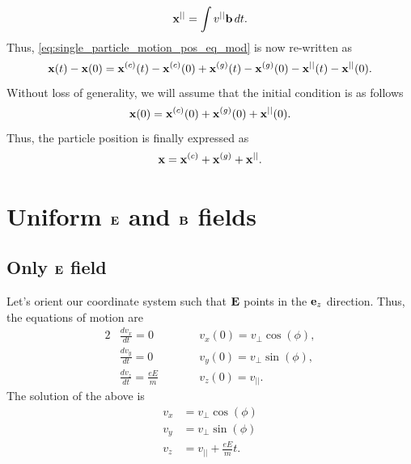 \documentclass[oneside,a4paper,11pt]{report}
\begin{document}
\begin{equation}
    \mathbf{x}^{||} = \int v^{||} \mathbf{b} \, dt.
\end{equation}
Thus, \cref{eq:single_particle_motion_pos_eq_mod} is now re-written as
\begin{equation}
    \mathbf{x}(t) - \mathbf{x}(0) = \mathbf{x}^{(c)}(t) - \mathbf{x}^{(c)}(0) + \mathbf{x}^{(g)}(t) - \mathbf{x}^{(g)}(0) - \mathbf{x}^{||}(t) - \mathbf{x}^{||}(0).
\end{equation}
Without loss of generality, we will assume that the initial condition is as follows
\begin{equation}
    \mathbf{x}(0) = \mathbf{x}^{(c)}(0) + \mathbf{x}^{(g)}(0) + \mathbf{x}^{||}(0).
\end{equation}
Thus, the particle position is finally expressed as
\begin{equation}
    \label{eq:single_particle_motion_pos_general}
    \mathbf{x} = \mathbf{x}^{(c)} + \mathbf{x}^{(g)} + \mathbf{x}^{||}.
\end{equation}


 
\section{Uniform $\mathbf{E}$ and $\mathbf{B}$ fields}

\subsection{Only $\mathbf{E}$ field}
Let's orient our coordinate system such that $\mathbf{E}$ points in the $\mathbf{e}_z$ direction. Thus, the equations of motion are
\begin{alignat}{2}
    &\frac{d v_x}{dt} = 0  \qquad && v_x(0) = v_\perp \cos(\phi), \nonumber \\
    &\frac{d v_y}{dt} = 0  \qquad && v_y(0) = v_\perp \sin(\phi), \nonumber \\
    &\frac{d v_z}{dt} = \frac{e E}{m}  \qquad && v_z(0) = v_{||}.
\end{alignat}
The solution of the above is
\begin{align}
    v_x &= v_\perp \cos(\phi) \nonumber \\
    v_y &= v_\perp \sin(\phi) \nonumber \\
    v_z &= v_{||} + \frac{e E}{m} t.
\end{align}
\end{document}
